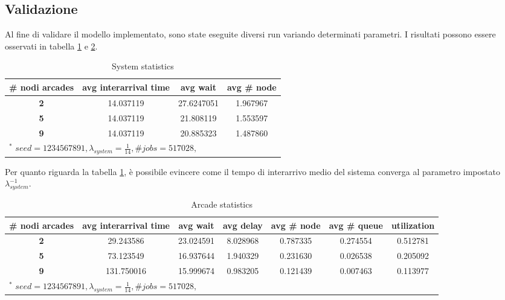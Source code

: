 \documentclass{article}
\begin{document}
\subsection{Validazione}
Al fine di validare il modello implementato, sono state eseguite diversi run variando determinati parametri. I risultati possono essere osservati in tabella \ref{tab1} e \ref{tab2}.

\begin{table}[htbp]
\caption{System statistics}
\begin{center}
\begin{tabular}{|c|c|c|c|}
\hline
\textbf{\# nodi arcades} & \textbf{avg interarrival time} & \textbf{avg wait} & \textbf{avg \# node} \\ \hline
\textbf{2} & 14.037119 & 27.6247051 & 1.967967 \\ \hline
\textbf{5} & 14.037119 & 21.808119 & 1.553597 \\ \hline
\textbf{9} & 14.037119 & 20.885323 & 1.487860 \\ \hline
\multicolumn{4}{l}{$^{\mathrm{*}}$ $seed=1234567891, \lambda_{system} =\frac{1}{14} , \# jobs=517028, $}
\end{tabular}
\label{tab1}
\end{center}
\end{table}

Per quanto riguarda la tabella \ref{tab1}, è possibile evincere come il tempo di interarrivo medio del sistema converga al parametro impostato $\lambda_{system}^{-1}$.


\begin{table}[htbp]
\caption{Arcade statistics}
\begin{center}
\begin{tabular}{|c|c|c|c|c|c|c|}
\hline
\textbf{\# nodi arcades} & \textbf{avg interarrival time} & \textbf{avg wait} & \textbf{avg delay} & \textbf{avg \# node} & \textbf{avg \# queue} & \textbf{utilization} \\ \hline
\textbf{2} & 29.243586 & 23.024591 & 8.028968 & 0.787335 & 0.274554 & 0.512781\\ \hline
\textbf{5} & 73.123549 & 16.937644 & 1.940329 & 0.231630 & 0.026538 & 0.205092\\ \hline
\textbf{9} & 131.750016 & 15.999674 & 0.983205 & 0.121439 & 0.007463 & 0.113977\\ \hline
\multicolumn{7}{l}{$^{\mathrm{*}}$ $seed=1234567891, \lambda_{system} =\frac{1}{14} , \# jobs=517028, $}
\end{tabular}
\label{tab2}
\end{center}
\end{table}
\end{document}
